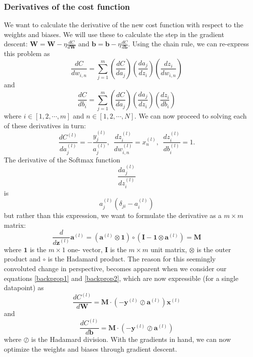 \documentclass[11pt,a4paper,titlepage]{article}
\begin{document}
\subsubsection{Derivatives of the cost function}
We want to calculate the derivative of the new cost function with respect to the weights and biases. We will use these to calculate the step in the gradient descent:
$\textbf{W} = \textbf{W} -\eta \frac{d C}{d\textbf{W} }$ and $\textbf{b} = \textbf{b} -\eta \frac{d C}{d\textbf{b} }$. Using the chain rule, we can re-express this problem as
\begin{equation}\label{backprop1}
\frac{dC}{dw_{i,n}} = \sum_{j=1}^m \left (\frac{dC}{da_j} \right) \left (\frac{da_j}{dz_i} \right) \left(\frac{dz_i}{dw_{i,n}} \right )
\end{equation}
and
\begin{equation}\label{backprop2}
\frac{dC}{db_i} = \sum_{j=1}^m \left (\frac{dC}{da_j} \right) \left (\frac{da_j}{dz_i} \right) \left(\frac{dz_i}{db_i} \right )
\end{equation}
where $i \in [1,2,\cdots,m]$ and $n \in [1,2,\cdots,N]$. We can now proceed to solving each of these derivatives in turn:
\begin{equation}
\frac{dC^{(l)}}{da_j^{(l)}} = - \frac{y_j^{(l)}}{a_j^{(l)}},\,\,\, \frac{dz_i^{(l)}}{dw_{i,n}^{(l)}} =  x_n^{(l)},\,\,\, \frac{dz_i^{(l)}}{db_i^{(l)}} =  1.
\end{equation}
The derivative of the Softmax function $$\frac{da_j^{(l)}}{dz_i^{(l)}}$$ is $$a_j^{(l)}(\delta_{ji}-a^{(l)}_i)$$ but rather than this expression, we want to formulate the derivative as a $m \times m$ matrix:
\begin{equation}
\frac{d}{d \textbf{z}^{(l)}} \textbf{a}^{(l)} = (\textbf{a}^{(l)} \otimes \mathbf{1} )\circ (\mathbf{I} - \mathbf{1} \otimes \textbf{a}^{(l)}) = \textbf{M}
\end{equation}
where $\mathbf{1}$ is the $m \times 1$ one- vector, $ \mathbf{I} $ is the $m \times m$ unit matrix, $\otimes$ is the outer product and $\circ$ is the Hadamard product. The reason for this seemingly convoluted change in perspective, becomes apparent when we consider our equations \eqref{backprop1} and \eqref{backprop2}, which are now expressible (for a single datapoint) as
\begin{equation}\label{gradientW}
\frac{dC^{(l)}}{d\textbf{W}} =  \textbf{M}\cdot(- \textbf{y}^{(l)}\oslash \textbf{a}^{(l)}) \textbf{x}^{(l)}
\end{equation}
and
\begin{equation}\label{gradientb}
\frac{dC^{(l)}}{d\textbf{b}} =  \textbf{M}\cdot(- \textbf{y}^{(l)}\oslash \textbf{a}^{(l)}) 
\end{equation}
where $\oslash$ is the Hadamard division. With the gradients in hand, we can now optimize the weights and biases through gradient descent.
\end{document}
